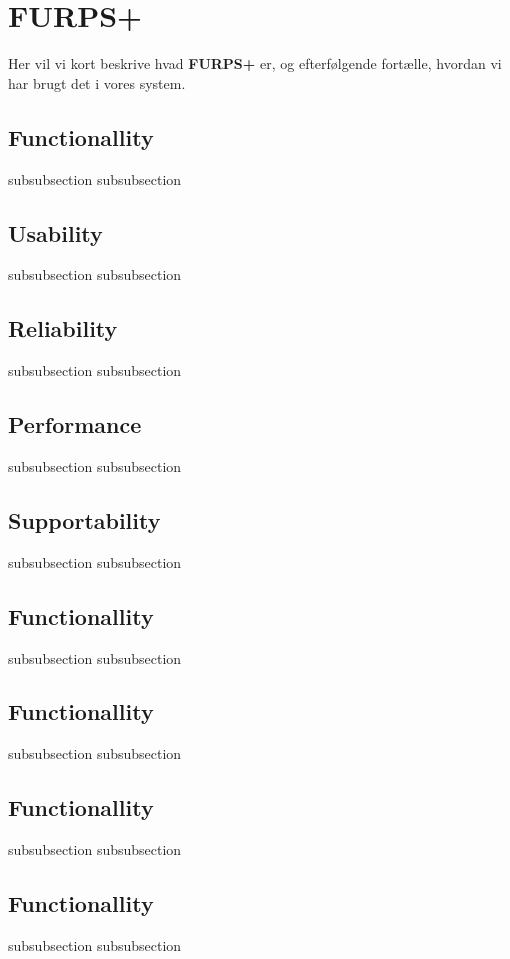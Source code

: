 \section{FURPS+}
Her vil vi kort beskrive hvad \textbf{FURPS+} er, og efterfølgende fortælle, hvordan vi har brugt det i vores system.
\subsection{Functionallity}
subsubsection{}
subsubsection{}
\subsection{Usability}
subsubsection{}
subsubsection{}
\subsection{Reliability}
subsubsection{}
subsubsection{}
\subsection{Performance}
subsubsection{}
subsubsection{}
\subsection{Supportability}
subsubsection{}
subsubsection{}
\subsection{Functionallity}
subsubsection{}
subsubsection{}
\subsection{Functionallity}
subsubsection{}
subsubsection{}
\subsection{Functionallity}
subsubsection{}
subsubsection{}
\subsection{Functionallity}
subsubsection{}
subsubsection{}
